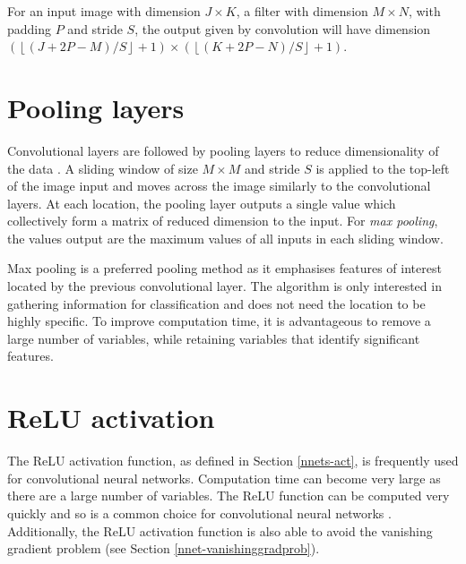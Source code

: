 For an input image with dimension $J \times K$, a filter with dimension $M \times N$, with padding $P$ and stride $S$, the output given by convolution will have dimension $\left(\left\lfloor (J + 2P - M)/S\right\rfloor + 1\right) \times \left(\left\lfloor (K + 2P - N)/S \right\rfloor + 1\right)$.

\section{Pooling layers}\label{convnets-pool}

Convolutional layers are followed by pooling layers to reduce dimensionality of the data \cite{ADeshpande2016}. A sliding window of size $M\times M$ and stride $S$ is applied to the top-left of the image input and moves across the image similarly to the convolutional layers. At each location, the pooling layer outputs a single value which collectively form a matrix of reduced dimension to the input. For \textit{max pooling}, the values output are the maximum values of all inputs in each sliding window.

Max pooling is a preferred pooling method as it emphasises features of interest located by the previous convolutional layer. The algorithm is only interested in gathering information for classification and does not need the location to be highly specific. To improve computation time, it is advantageous to remove a large number of variables, while retaining variables that identify significant features.

\section{ReLU activation}\label{convnets-act}

The ReLU activation function, as defined in Section \ref{nnets-act}, is frequently used for  convolutional neural networks. Computation time can become very large as there are a large number of variables. The ReLU function can be computed very quickly and so is a common choice for convolutional neural networks \cite{ADeshpande2016}. Additionally, the ReLU activation function is also able to avoid the vanishing gradient problem (see Section \ref{nnet-vanishinggradprob}).


%
%

